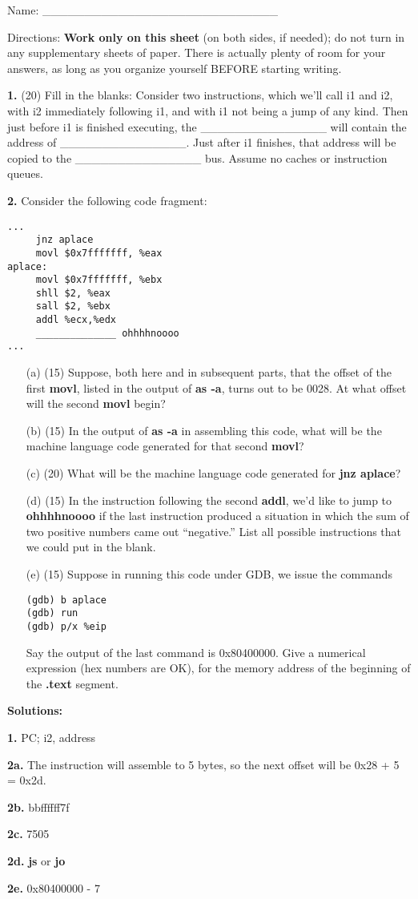 \documentclass[twocolumn]{article}
\begin{document}
Name: \_\_\_\_\_\_\_\_\_\_\_\_\_\_\_\_\_\_\_\_\_\_\_\_\_\_\_\_

Directions: {\bf Work only on this sheet} (on both sides, if needed); do not
turn in any supplementary sheets of paper. There is actually plenty of room
for your answers, as long as you organize yourself BEFORE starting writing.

{\bf 1.} (20) Fill in the blanks:  Consider two instructions, which we'll
call i1 and i2, with i2 immediately following i1, and with i1 not being
a jump of any kind.  Then just before i1 is finished executing, the
\_\_\_\_\_\_\_\_\_\_\_\_\_\_\_ will contain the address of
\_\_\_\_\_\_\_\_\_\_\_\_\_\_\_.  Just after i1 finishes, that address
will be copied to the \_\_\_\_\_\_\_\_\_\_\_\_\_\_\_ bus.   Assume no
caches or instruction queues.

{\bf 2.} Consider the following code fragment:

\begin{Verbatim}[fontsize=\relsize{-2}]
...
     jnz aplace
     movl $0x7fffffff, %eax
aplace:
     movl $0x7fffffff, %ebx
     shll $2, %eax
     sall $2, %ebx
     addl %ecx,%edx
     ______________ ohhhhnoooo
...
\end{Verbatim}

\begin{itemize}

\item [(a)] (15) Suppose, both here and in subsequent parts, that the
offset of the first {\bf movl}, listed in the output of {\bf as -a},
turns out to be 0028.  At what offset will the second {\bf movl} begin?

\item [(b)] (15) In the output of {\bf as -a} in assembling this code,
what will be the machine language code generated for that second {\bf
movl}?

\item [(c)] (20) What will be the machine language code generated for 
{\bf jnz aplace}?

\item [(d)] (15) In the instruction following the second {\bf addl}, we'd
like to jump to {\bf ohhhhnoooo} if the last instruction produced a
situation in which the sum of two positive numbers came out
``negative.''  List all possible instructions that we could put in the
blank.

\item [(e)] (15) Suppose in running this code under GDB, we issue the
commands

\begin{Verbatim}[fontsize=\relsize{-2}]
(gdb) b aplace
(gdb) run
(gdb) p/x %eip
\end{Verbatim}

Say the output of the last command is 0x80400000.  Give a numerical
expression (hex numbers are OK), for the memory address of the beginning
of the {\bf .text} segment.

\end{itemize}

{\bf Solutions:}

{\bf 1.}  PC; i2, address

{\bf 2a.} The instruction will assemble to 5 bytes, so the next offset
will be 0x28 + 5 = 0x2d.

{\bf 2b.} bbffffff7f

{\bf 2c.} 7505

{\bf 2d.} {\bf js} or {\bf jo}

{\bf 2e.} 0x80400000 - 7
\end{document}
